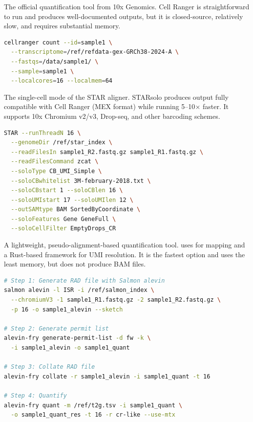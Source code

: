 \begin{description}[style=nextline, font=\bfseries, itemsep=3pt]
  \item[Cell Ranger (10x Genomics)]
  The official quantification tool from 10x Genomics. Cell Ranger is straightforward to run and produces well-documented outputs, but it is closed-source, relatively slow, and requires substantial memory.

\begin{lstlisting}[language=bash,caption={Cell Ranger count command.},label=lst:cellranger]
cellranger count --id=sample1 \
  --transcriptome=/ref/refdata-gex-GRCh38-2024-A \
  --fastqs=/data/sample1/ \
  --sample=sample1 \
  --localcores=16 --localmem=64
\end{lstlisting}

  \item[STARsolo]
  The single-cell mode of the STAR aligner. STARsolo produces output fully compatible with Cell Ranger (MEX format) while running 5--10$\times$ faster. It supports 10x Chromium v2/v3, Drop-seq, and other barcoding schemes.

\begin{lstlisting}[language=bash,caption={STARsolo command for 10x Chromium v3.},label=lst:starsolo-cmd]
STAR --runThreadN 16 \
  --genomeDir /ref/star_index \
  --readFilesIn sample1_R2.fastq.gz sample1_R1.fastq.gz \
  --readFilesCommand zcat \
  --soloType CB_UMI_Simple \
  --soloCBwhitelist 3M-february-2018.txt \
  --soloCBstart 1 --soloCBlen 16 \
  --soloUMIstart 17 --soloUMIlen 12 \
  --outSAMtype BAM SortedByCoordinate \
  --soloFeatures Gene GeneFull \
  --soloCellFilter EmptyDrops_CR
\end{lstlisting}

  \item[alevin-fry (Salmon)]
  A lightweight, pseudo-alignment-based quantification tool.  uses  for mapping and a Rust-based framework for UMI resolution. It is the fastest option and uses the least memory, but does not produce BAM files.

\begin{lstlisting}[language=bash,caption={alevin-fry quantification pipeline.},label=lst:alevin-fry]
# Step 1: Generate RAD file with Salmon alevin
salmon alevin -l ISR -i /ref/salmon_index \
  --chromiumV3 -1 sample1_R1.fastq.gz -2 sample1_R2.fastq.gz \
  -p 16 -o sample1_alevin --sketch

# Step 2: Generate permit list
alevin-fry generate-permit-list -d fw -k \
  -i sample1_alevin -o sample1_quant

# Step 3: Collate RAD file
alevin-fry collate -r sample1_alevin -i sample1_quant -t 16

# Step 4: Quantify
alevin-fry quant -m /ref/t2g.tsv -i sample1_quant \
  -o sample1_quant_res -t 16 -r cr-like --use-mtx
\end{lstlisting}
\end{description}

